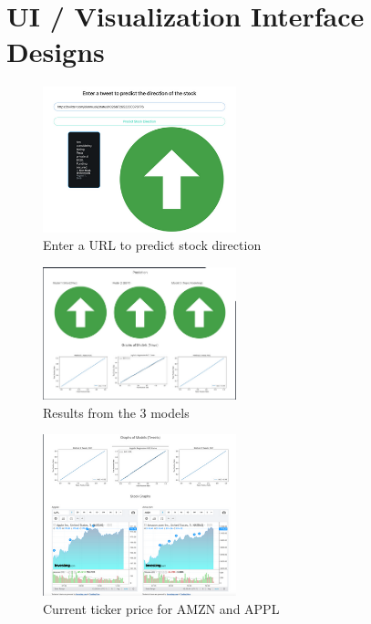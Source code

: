 \documentclass[conference]{IEEEtran}
\begin{document}
\section{UI / Visualization Interface Designs}
\begin{figure}[h!]
  \caption{Enter a URL to predict stock direction}
  \includegraphics[width=0.5\textwidth]{2.png}
\end{figure}
\begin{figure}[h!]
  \caption{Results from the 3 models}
  \includegraphics[width=0.5\textwidth]{1.png}
\end{figure}
\begin{figure}[h!]
  \caption{Current ticker price for AMZN and APPL}
  \includegraphics[width=0.5\textwidth]{3.png}
\end{figure}
\end{document}
